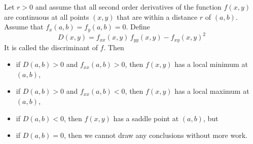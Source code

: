 \begin{theorem}\label{thm second deriv test}
Let $r>0$ and assume that all second order derivatives of the function 
$f(x,y)$ are continuous at all points $(x,y)$ that are within a distance
$r$ of $(a,b)$. Assume that $f_x(a,b)=f_y(a,b)=0$. 
Define
\begin{equation*}
D(x,y) = f_{xx}(x,y)\,f_{yy}(x,y) - f_{xy}(x,y)^2
\end{equation*}
It is called the discriminant of $f$. Then
\begin{itemize}
\item 
if $D(a,b)>0$ and $f_{xx}(a,b)>0$, then $f(x,y)$ has a local minimum 
at $(a,b)$, 
\item 
if $D(a,b)>0$ and $f_{xx}(a,b)<0$, then $f(x,y)$ has a local maximum 
at $(a,b)$, 
\item 
if $D(a,b)<0$, then $f(x,y)$ has a saddle point at $(a,b)$, but
\item 
if $D(a,b)=0$, then we cannot  draw any conclusions without more work.
\end{itemize}
\end{theorem}

